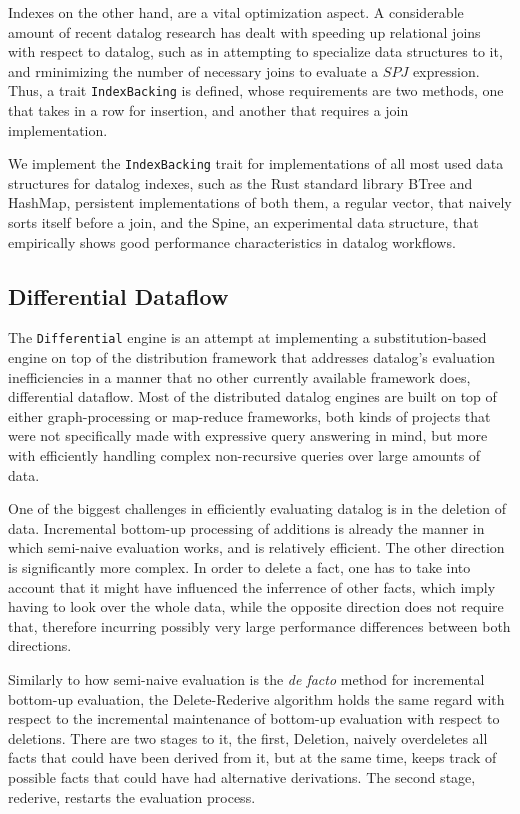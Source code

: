 \documentclass[manuscript,screen,review]{acmart}
\theoremstyle{definition}
\begin{document}
Indexes on the other hand, are a vital optimization aspect. A considerable amount of recent datalog research has dealt with speeding up relational joins
with respect to datalog, such as in attempting to specialize data structures to it\cite{souffle_btree}, and rminimizing the number of necessary
joins to evaluate a $SPJ$ expression\cite{primitive_search}. Thus, a trait \verb|IndexBacking| is defined, whose requirements are two methods, one
that takes in a row for insertion, and another that requires a join implementation.

We implement the \verb|IndexBacking| trait for implementations of all most used data structures for datalog indexes, such as the Rust standard
library BTree\cite{rust_btree} and HashMap, persistent implementations of both them, a regular vector, that naively sorts itself before a
join, and the Spine, an experimental data structure, that empirically shows good performance characteristics in datalog workflows.

\subsection{Differential Dataflow}

The \verb|Differential| engine is an attempt at implementing a substitution-based engine on top of the distribution framework that addresses datalog's
evaluation inefficiencies in a manner that no other currently available framework does, differential dataflow\cite{dd}. Most of the distributed datalog engines are
built on top of either graph-processing or map-reduce frameworks, both kinds of projects that were not specifically made with expressive query answering in mind, but
more with efficiently handling complex non-recursive queries over large amounts of data.

One of the biggest challenges in efficiently evaluating datalog is in the deletion of data. Incremental bottom-up processing of additions is already the
manner in which semi-naive evaluation works, and is relatively efficient. The other direction is significantly more complex. In order to delete a fact,
one has to take into account that it might have influenced the inferrence of other facts, which imply having to look over the whole data, while the opposite
direction does not require that, therefore incurring possibly very large performance differences between both directions.

Similarly to how semi-naive evaluation is the \textit{de facto} method for incremental bottom-up evaluation, the Delete-Rederive\cite{dred} algorithm holds
the same regard with respect to the incremental maintenance of bottom-up evaluation with respect to deletions. There are two stages to it, the first, Deletion,
naively overdeletes all facts that could have been derived from it, but at the same time, keeps track of possible facts that could have had alternative
derivations. The second stage, rederive, restarts the evaluation process.
\end{document}

